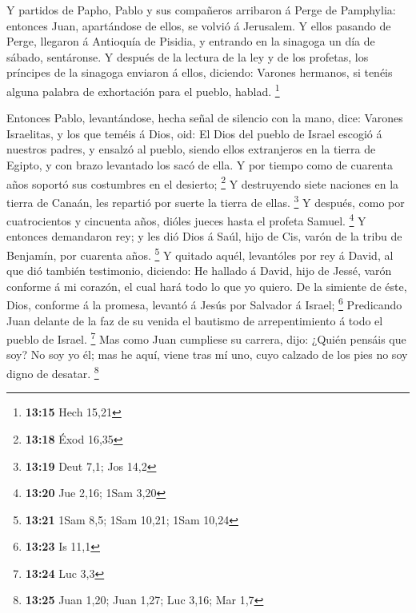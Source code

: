 Y partidos de Papho, Pablo y sus compañeros arribaron á
Perge de Pamphylia: entonces Juan, apartándose de ellos, se volvió á
Jerusalem.  Y ellos pasando de Perge, llegaron á Antioquía
de Pisidia, y entrando en la sinagoga un día de sábado, sentáronse.
 Y después de la lectura de la ley y de los profetas, los
príncipes de la sinagoga enviaron á ellos, diciendo: Varones hermanos,
si tenéis alguna palabra de exhortación para el pueblo, hablad.
\footnote{\textbf{13:15} Hech 15,21}

 Entonces Pablo, levantándose, hecha señal de silencio con
la mano, dice: Varones Israelitas, y los que teméis á Dios, oid:
 El Dios del pueblo de Israel escogió á nuestros padres, y
ensalzó al pueblo, siendo ellos extranjeros en la tierra de Egipto, y
con brazo levantado los sacó de ella.  Y por tiempo como de
cuarenta años soportó sus costumbres en el desierto; \footnote{\textbf{13:18}
  Éxod 16,35}  Y destruyendo siete naciones en la tierra de
Canaán, les repartió por suerte la tierra de ellas. \footnote{\textbf{13:19}
  Deut 7,1; Jos 14,2}  Y después, como por cuatrocientos y
cincuenta años, dióles jueces hasta el profeta Samuel. \footnote{\textbf{13:20}
  Jue 2,16; 1Sam 3,20}  Y entonces demandaron rey; y les
dió Dios á Saúl, hijo de Cis, varón de la tribu de Benjamín, por
cuarenta años. \footnote{\textbf{13:21} 1Sam 8,5; 1Sam 10,21; 1Sam 10,24}
 Y quitado aquél, levantóles por rey á David, al que dió
también testimonio, diciendo: He hallado á David, hijo de Jessé, varón
conforme á mi corazón, el cual hará todo lo que yo quiero. 
De la simiente de éste, Dios, conforme á la promesa, levantó á Jesús por
Salvador á Israel; \footnote{\textbf{13:23} Is 11,1} 
Predicando Juan delante de la faz de su venida el bautismo de
arrepentimiento á todo el pueblo de Israel. \footnote{\textbf{13:24} Luc
  3,3}  Mas como Juan cumpliese su carrera, dijo: ¿Quién
pensáis que soy? No soy yo él; mas he aquí, viene tras mí uno, cuyo
calzado de los pies no soy digno de desatar. \footnote{\textbf{13:25}
  Juan 1,20; Juan 1,27; Luc 3,16; Mar 1,7}

